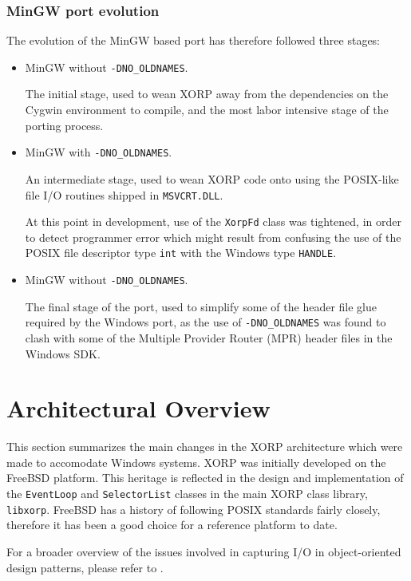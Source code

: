 \documentclass[11pt]{article}
\begin{document}
\subsubsection{MinGW port evolution}

The evolution of the MinGW based port has therefore followed three stages:
\begin{itemize}
 \item MinGW without {\tt -DNO\_OLDNAMES}.

The initial stage, used to wean XORP away from the dependencies on the Cygwin
environment to compile, and the most labor intensive stage of the porting process.

 \item MinGW with {\tt -DNO\_OLDNAMES}.

An intermediate stage, used to wean XORP code onto using the POSIX-like
file I/O routines shipped in {\tt MSVCRT.DLL}.

At this point in development, use of the {\tt XorpFd} class was tightened, in order to detect
programmer error which might result from confusing the use of the POSIX
file descriptor type {\tt int} with the Windows type {\tt HANDLE}.

 \item MinGW without {\tt -DNO\_OLDNAMES}.

The final stage of the port, used to simplify some of the header file glue
required by the Windows port, as the use of {\tt -DNO\_OLDNAMES} was found to clash
with some of the Multiple Provider Router (MPR) header files in the Windows SDK.
\end{itemize}

\section{Architectural Overview}

This section summarizes the main changes in the XORP architecture which
were made to accomodate Windows systems.
XORP was initially developed on the FreeBSD platform. This heritage
is reflected in the design and implementation of the {\tt EventLoop}
and {\tt SelectorList} classes in the main XORP class library,
{\tt libxorp}. FreeBSD has a history of following POSIX standards
fairly closely, therefore it has been a good choice for a reference
platform to date.

For a broader overview of the issues involved in capturing I/O
in object-oriented design patterns, please refer to \cite{schmidt:1999:AOA}.
\end{document}
